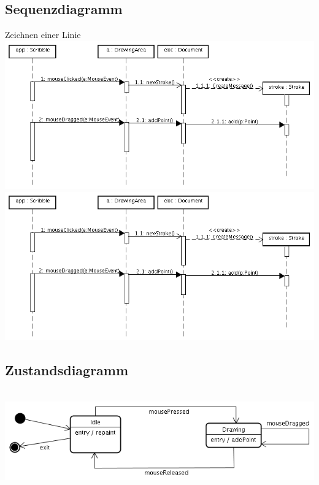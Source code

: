 \subsection{Sequenzdiagramm} Zeichnen einer Linie\\[2ex]
%
\ifslides
\includegraphics[width=0.9\linewidth]{examples/Scribble/doc/scribble-seq}
\else
\includegraphics[width=\linewidth]{examples/Scribble/doc/scribble-seq}\\[2ex]
\newpage
\subsection{Zustandsdiagramm} \ \\[2ex]
\includegraphics[width=0.9\linewidth]{examples/Scribble/doc/scribble-statechart}
%

